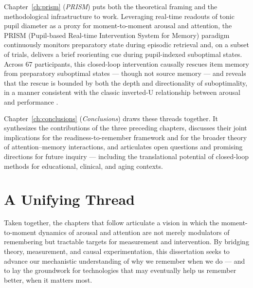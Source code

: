 Chapter~\ref{ch:prism} (\textit{PRISM}) puts both the theoretical framing and the methodological infrastructure to work. Leveraging real-time readouts of tonic pupil diameter as a proxy for moment-to-moment arousal and attention, the PRISM (Pupil-based Real-time Intervention System for Memory) paradigm continuously monitors preparatory state during episodic retrieval and, on a subset of trials, delivers a brief reorienting cue during pupil-indexed suboptimal states. Across 67 participants, this closed-loop intervention causally rescues item memory from preparatory suboptimal states --- though not source memory --- and reveals that the rescue is bounded by both the depth and directionality of suboptimality, in a manner consistent with the classic inverted-U relationship between arousal and performance \parencite{yerkes1908relation,astonjones2005integrative}.

Chapter~\ref{ch:conclusions} (\textit{Conclusions}) draws these threads together. It synthesizes the contributions of the three preceding chapters, discusses their joint implications for the readiness-to-remember framework and for the broader theory of attention--memory interactions, and articulates open questions and promising directions for future inquiry --- including the translational potential of closed-loop methods for educational, clinical, and aging contexts.

\section{A Unifying Thread}

Taken together, the chapters that follow articulate a vision in which the moment-to-moment dynamics of arousal and attention are not merely modulators of remembering but tractable targets for measurement and intervention. By bridging theory, measurement, and causal experimentation, this dissertation seeks to advance our mechanistic understanding of why we remember when we do --- and to lay the groundwork for technologies that may eventually help us remember better, when it matters most.
